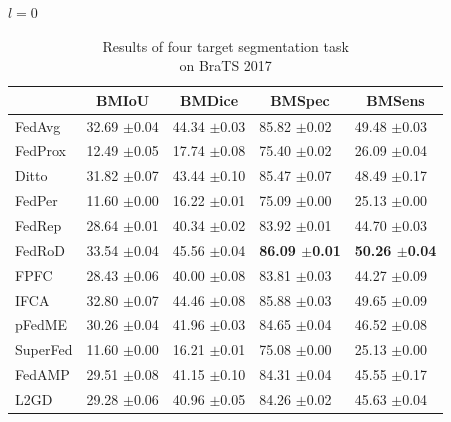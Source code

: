 \documentclass[journal]{IEEEtran}
\begin{document}
\begin{table}
	\scriptsize
	\caption{Results of four target segmentation task\\ on BraTS 2017} 
	\label{table_Tram4_classification}	
	\centering
	\begin{subtable}[]{$l=0$}
		\begin{tabular}{@{}lllll@{}}
			\toprule
			\multicolumn{1}{c}{} & \multicolumn{1}{c}{BMIoU} & \multicolumn{1}{c}{BMDice} & \multicolumn{1}{c}{BMSpec} & \multicolumn{1}{c}{BMSens} \\ \midrule
			FedAvg               & 32.69 $\pm$0.04           & 44.34 $\pm$0.03            & 85.82 $\pm$0.02            & 49.48 $\pm$0.03            \\
			FedProx              & 12.49 $\pm$0.05           & 17.74 $\pm$0.08            & 75.40 $\pm$0.02            & 26.09 $\pm$0.04            \\
			Ditto                & 31.82 $\pm$0.07           & 43.44 $\pm$0.10            & 85.47 $\pm$0.07            & 48.49 $\pm$0.17            \\
			FedPer               & 11.60 $\pm$0.00           & 16.22 $\pm$0.01            & 75.09 $\pm$0.00            & 25.13 $\pm$0.00            \\
			FedRep               & 28.64 $\pm$0.01           & 40.34 $\pm$0.02            & 83.92 $\pm$0.01            & 44.70 $\pm$0.03            \\
			FedRoD               & 33.54 $\pm$0.04           & 45.56 $\pm$0.04            & \textbf{86.09 $\pm$0.01}   & \textbf{50.26 $\pm$0.04}   \\
			FPFC                 & 28.43 $\pm$0.06           & 40.00 $\pm$0.08            & 83.81 $\pm$0.03            & 44.27 $\pm$0.09            \\
			IFCA                 & 32.80 $\pm$0.07           & 44.46 $\pm$0.08            & 85.88 $\pm$0.03            & 49.65 $\pm$0.09            \\
			pFedME               & 30.26 $\pm$0.04           & 41.96 $\pm$0.03            & 84.65 $\pm$0.04            & 46.52 $\pm$0.08            \\
			SuperFed             & 11.60 $\pm$0.00           & 16.21 $\pm$0.01            & 75.08 $\pm$0.00            & 25.13 $\pm$0.00            \\
			FedAMP               & 29.51 $\pm$0.08           & 41.15 $\pm$0.10            & 84.31 $\pm$0.04            & 45.55 $\pm$0.17            \\
			L2GD                 & 29.28 $\pm$0.06           & 40.96 $\pm$0.05            & 84.26 $\pm$0.02            & 45.63 $\pm$0.04            \\

\end{tabular}
\end{subtable}
\end{table}
\end{document}
